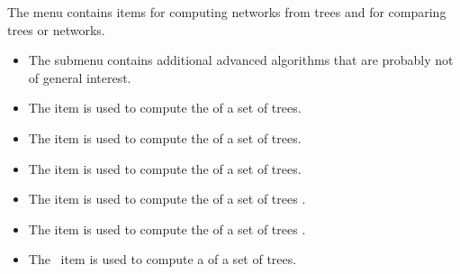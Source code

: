 \documentclass[11pt]{article}
\begin{document}
The  menu contains items for computing networks from trees and for comparing trees or networks.
\begin{itemize}
\item The  submenu contains additional advanced algorithms that are probably not
of general interest.
\item  The  item is used to compute the  of a set of trees.
\item  The  item is used to compute the  of a set of trees.
\item  The  item is used to compute the  of a set of trees.
\item  The  item is used to compute the  of a set of trees \cite{PhylogeneticNetworks2010}.
\item  The  item is used to compute the  of a set of trees \cite{Primodial2013}.
\item  The ~item is used to compute a 
 of a set of trees. 


\end{itemize}
\end{document}
